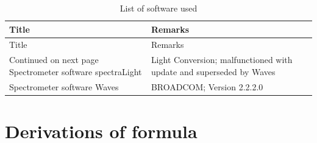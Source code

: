 \documentclass[twoside,openright]{scrreprt}
\begin{document}
\begin{longtable}{p{}p{}}
    \caption{List of software used}
    \label{tab:devices} \\
    \toprule 
    Title & Remarks \\
    \midrule
    \endfirsthead
    \toprule 
    Title & Remarks \\
    \midrule
    \endhead
    \midrule
    Continued on next page
    \endfoot
    \bottomrule
    \endlastfoot
    Spectrometer software spectraLight & Light Conversion; malfunctioned with update and superseded by Waves \\
    Spectrometer software Waves & BROADCOM; Version 2.2.2.0\\
\end{longtable}

\chapter{Derivations of formula}
\end{document}
